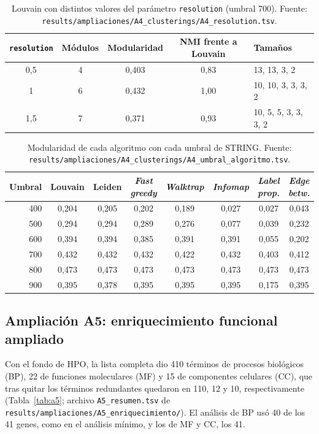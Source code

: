 \begin{table}[h!]
	\renewcommand{\arraystretch}{1.25}
	\caption{Louvain con distintos valores del parámetro \texttt{resolution} (umbral 700). Fuente: \texttt{results/ampliaciones/A4\_clusterings/A4\_resolution.tsv}.}
	\label{tab:a4res}
	\begin{tabular}{ccccl}
		\hline
		\texttt{resolution} & Módulos & Modularidad & NMI frente a Louvain & Tamaños \tabularnewline
		\hline
		0,5 & 4 & 0,403 & 0,83 & 13, 13, 3, 2 \tabularnewline
		1 & 6 & 0,432 & 1,00 & 10, 10, 3, 3, 3, 2 \tabularnewline
		1,5 & 7 & 0,371 & 0,93 & 10, 5, 5, 3, 3, 3, 2 \tabularnewline
		\hline
	\end{tabular}
\end{table}

\begin{table}[h!]
	\footnotesize
	\setlength{\tabcolsep}{3.5pt}
	\renewcommand{\arraystretch}{1.25}
	\caption{Modularidad de cada algoritmo con cada umbral de STRING. Fuente: \texttt{results/ampliaciones/A4\_clusterings/A4\_umbral\_algoritmo.tsv}.}
	\label{tab:a4umbral}
	\begin{tabular}{rccccccc}
		\hline
		Umbral & Louvain & Leiden & \textit{Fast greedy} & \textit{Walktrap} & \textit{Infomap} & \textit{Label prop.} & \textit{Edge betw.} \tabularnewline
		\hline
		400 & 0,204 & 0,205 & 0,202 & 0,189 & 0,027 & 0,027 & 0,043 \tabularnewline
		500 & 0,294 & 0,294 & 0,289 & 0,276 & 0,077 & 0,039 & 0,232 \tabularnewline
		600 & 0,394 & 0,394 & 0,385 & 0,391 & 0,391 & 0,055 & 0,202 \tabularnewline
		700 & 0,432 & 0,432 & 0,432 & 0,422 & 0,432 & 0,403 & 0,412 \tabularnewline
		800 & 0,473 & 0,473 & 0,473 & 0,473 & 0,473 & 0,473 & 0,473 \tabularnewline
		900 & 0,395 & 0,378 & 0,395 & 0,395 & 0,395 & 0,175 & 0,395 \tabularnewline
		\hline
	\end{tabular}
\end{table}

\subsection{Ampliación A5: enriquecimiento funcional ampliado}
Con el fondo de HPO, la lista completa dio 410 términos de procesos biológicos (BP), 22 de funciones moleculares (MF) y 15 de componentes celulares (CC), que tras quitar los términos redundantes quedaron en 110, 12 y 10, respectivamente (Tabla~\ref{tab:a5}; archivo \texttt{A5\_resumen.tsv} de \texttt{results/ampliaciones/A5\_enriquecimiento/}). El análisis de BP usó 40 de los 41 genes, como en el análisis mínimo, y los de MF y CC, los 41.

